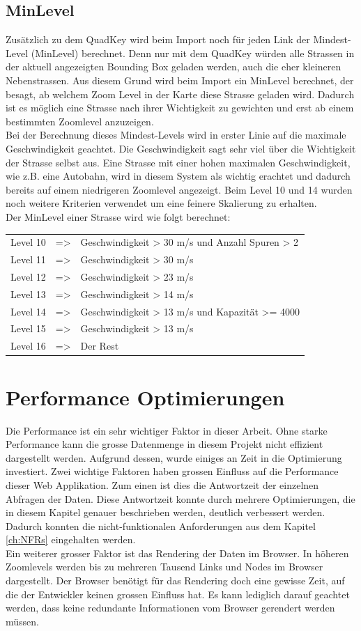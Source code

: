 \subsection{MinLevel}
Zusätzlich zu dem QuadKey wird beim Import noch für jeden Link der Mindest-Level (MinLevel) berechnet. Denn nur mit dem QuadKey würden alle Strassen in der aktuell angezeigten Bounding Box geladen werden, auch die eher kleineren Nebenstrassen. Aus diesem Grund wird beim Import ein MinLevel berechnet, der besagt, ab welchem Zoom Level in der Karte diese Strasse geladen wird. Dadurch ist es möglich eine Strasse nach ihrer Wichtigkeit zu gewichten und erst ab einem bestimmten Zoomlevel anzuzeigen. \\
Bei der Berechnung dieses Mindest-Levels wird in erster Linie auf die maximale  Geschwindigkeit geachtet. Die Geschwindigkeit sagt sehr viel über die Wichtigkeit der Strasse selbst aus. Eine Strasse mit einer hohen maximalen Geschwindigkeit, wie z.B. eine Autobahn, wird in diesem System als wichtig erachtet und dadurch bereits auf einem niedrigeren Zoomlevel angezeigt. Beim Level 10 und 14 wurden noch weitere Kriterien verwendet um eine feinere Skalierung zu erhalten.\\
Der MinLevel einer Strasse wird wie folgt berechnet:\\[0.3cm]
\begin{tabular}{l c l} 
Level 10 & => & Geschwindigkeit > 30 m/s und Anzahl Spuren > 2 \\ 
Level 11 & => & Geschwindigkeit > 30 m/s  \\ 
Level 12 & => & Geschwindigkeit > 23 m/s \\ 
Level 13 & => & Geschwindigkeit > 14 m/s \\ 
Level 14 & => & Geschwindigkeit > 13 m/s und Kapazität >= 4000  \\ 
Level 15 & => & Geschwindigkeit > 13 m/s \\ 
Level 16 & => & Der Rest \\ 
\end{tabular} 
\section{Performance Optimierungen}
Die Performance ist ein sehr wichtiger Faktor in dieser Arbeit. Ohne starke Performance kann die grosse Datenmenge in diesem Projekt nicht effizient dargestellt werden. Aufgrund dessen, wurde einiges an Zeit in die Optimierung investiert. Zwei wichtige Faktoren haben grossen Einfluss auf die Performance dieser Web Applikation. Zum einen ist dies die Antwortzeit der einzelnen Abfragen der Daten. Diese Antwortzeit konnte durch mehrere Optimierungen, die in diesem Kapitel genauer beschrieben werden, deutlich verbessert werden. Dadurch konnten die nicht-funktionalen Anforderungen aus dem Kapitel \ref{ch:NFRs} eingehalten werden.\\
Ein weiterer grosser Faktor ist das Rendering der Daten im Browser. In höheren Zoomlevels werden bis zu mehreren Tausend Links und Nodes im Browser dargestellt. Der Browser benötigt für das Rendering doch eine gewisse Zeit, auf die der Entwickler keinen grossen Einfluss hat. Es kann lediglich darauf geachtet werden, dass keine redundante Informationen vom Browser gerendert werden müssen.
